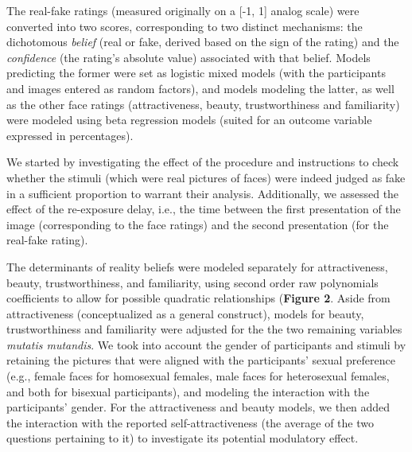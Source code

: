\documentclass[
  man,floatsintext]{apa6}
\begin{document}
The real-fake ratings (measured originally on a {[}-1, 1{]} analog scale) were converted into two scores, corresponding to two distinct mechanisms: the dichotomous \emph{belief} (real or fake, derived based on the sign of the rating) and the \emph{confidence} (the rating's absolute value) associated with that belief. Models predicting the former were set as logistic mixed models (with the participants and images entered as random factors), and models modeling the latter, as well as the other face ratings (attractiveness, beauty, trustworthiness and familiarity) were modeled using beta regression models (suited for an outcome variable expressed in percentages).

We started by investigating the effect of the procedure and instructions to check whether the stimuli (which were real pictures of faces) were indeed judged as fake in a sufficient proportion to warrant their analysis. Additionally, we assessed the effect of the re-exposure delay, i.e., the time between the first presentation of the image (corresponding to the face ratings) and the second presentation (for the real-fake rating).

The determinants of reality beliefs were modeled separately for attractiveness, beauty, trustworthiness, and familiarity, using second order raw polynomials coefficients to allow for possible quadratic relationships (\textbf{Figure 2}. Aside from attractiveness (conceptualized as a general construct), models for beauty, trustworthiness and familiarity were adjusted for the the two remaining variables \emph{mutatis mutandis}. We took into account the gender of participants and stimuli by retaining the pictures that were aligned with the participants' sexual preference (e.g., female faces for homosexual females, male faces for heterosexual females, and both for bisexual participants), and modeling the interaction with the participants' gender. For the attractiveness and beauty models, we then added the interaction with the reported self-attractiveness (the average of the two questions pertaining to it) to investigate its potential modulatory effect.
\end{document}
